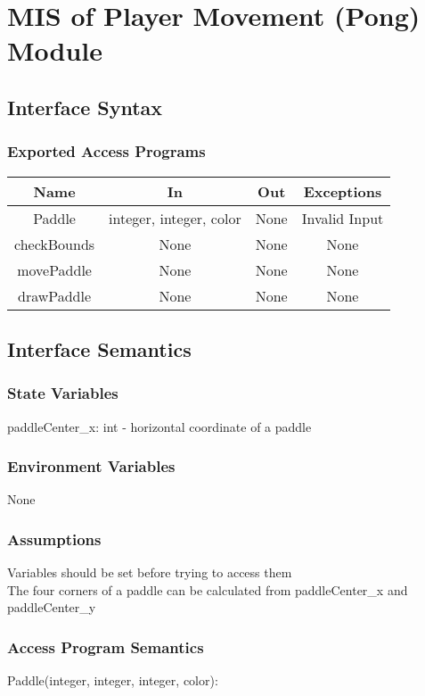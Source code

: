 \documentclass[12pt, titlepage]{article}
\begin{document}
\section{MIS of Player Movement (Pong) Module}
		\subsection{Interface Syntax}
		\subsubsection{Exported Access Programs}
		\begin{tabular}[pos]{|c|c|c|c|}
			\hline
			\textbf{Name}& \textbf{In} & \textbf{Out} & \textbf{Exceptions} \\ \hline
			Paddle & integer, integer, color & None & Invalid Input \\ \hline
			checkBounds & None & None & None \\ \hline
			movePaddle & None & None & None \\ \hline
			drawPaddle & None & None & None \\ \hline
		\end{tabular}
		
		\subsection{Interface Semantics}
		\subsubsection{State Variables}
		paddleCenter\_x: int - horizontal coordinate of a paddle
		
		\subsubsection{Environment Variables}
		None
		\subsubsection{Assumptions}
		Variables should be set before trying to access them \\ 
		The four corners of a paddle can be calculated from paddleCenter\_x and paddleCenter\_y \\
		
		\subsubsection{Access Program Semantics}
		Paddle(integer, integer, integer, color):
		
\end{document}
